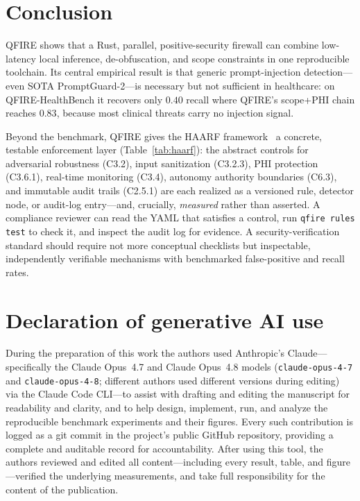 \documentclass[11pt]{article}
\begin{document}
\section{Conclusion}
QFIRE shows that a Rust, parallel, positive-security firewall can combine
low-latency local inference, de-obfuscation, and scope constraints in one
reproducible toolchain. Its central empirical result is that generic
prompt-injection detection---even SOTA PromptGuard-2---is necessary but not
sufficient in healthcare: on QFIRE-HealthBench it recovers only $0.40$ recall
where QFIRE's scope+PHI chain reaches $0.83$, because most clinical threats carry
no injection signal.

Beyond the benchmark, QFIRE gives the HAARF framework~\cite{schwoebel2026haarf} a concrete,
testable enforcement layer (Table~\ref{tab:haarf}): the abstract controls for
adversarial robustness (C3.2), input sanitization (C3.2.3), PHI protection
(C3.6.1), real-time monitoring (C3.4), autonomy authority boundaries (C6.3), and
immutable audit trails (C2.5.1) are each realized as a versioned rule, detector
node, or audit-log entry---and, crucially, \emph{measured} rather than asserted.
A compliance reviewer can read the YAML that satisfies a control, run
\texttt{qfire rules test} to check it, and inspect the audit log for evidence.
A security-verification standard should require not more conceptual checklists but
inspectable, independently verifiable mechanisms with benchmarked false-positive
and recall rates.

\section*{Declaration of generative AI use}
During the preparation of this work the authors used Anthropic's Claude---specifically
the Claude Opus~4.7 and Claude Opus~4.8 models (\texttt{claude-opus-4-7} and
\texttt{claude-opus-4-8}; different authors used different versions during
editing) via the Claude Code CLI---to assist with drafting and editing the
manuscript for readability and clarity, and to help design, implement, run, and
analyze the reproducible benchmark experiments and their figures. Every such
contribution is logged as a git commit in the project's public GitHub repository,
providing a complete and auditable record for accountability. After using this
tool, the authors reviewed and edited all content---including every result, table,
and figure---verified the underlying measurements, and take full responsibility
for the content of the publication.
\end{document}
